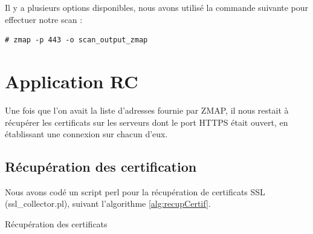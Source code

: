 Il y a plusieurs options disponibles, nous avons utilisé la commande suivante pour effectuer notre scan :
\begin{verbatim}
# zmap -p 443 -o scan_output_zmap
\end{verbatim}

\section{Application RC}

Une fois que l'on avait la liste d'adresses fournie par ZMAP, il nous restait à récupérer les certificats sur les serveurs dont le port HTTPS était ouvert, en établissant une connexion sur chacun d'eux.\\

\subsection{Récupération des certification}

Nous avons codé un script perl pour la récupération de certificats SSL (ssl\_collector.pl), suivant l'algorithme \ref{alg:recupCertif}.\\


\begin{algorithm}[H]
\label{alg:recupCertif}
 

\caption{Récupération des certificats} 
\end{algorithm}
\vspace{0.7cm}


